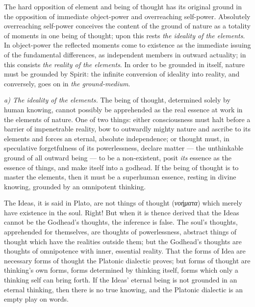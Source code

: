 \documentclass[12pt,a4paper]{book}
\newcommand{\runin}[1]{\emph{#1}\hspace{0.4em}}
\begin{document}
The hard opposition of element and being of thought has its original ground in the opposition of immediate
object-power and overreaching self-power. Absolutely overreaching self-power conceives the content of the ground of
nature as a totality of moments in one being of thought; upon this rests \emph{the ideality of the elements}. In
object-power the reflected moments come to existence as the immediate issuing of the fundamental differences, as
independent members in outward actuality; in this consists \emph{the reality of the elements}. In order to be
grounded in itself, nature must be grounded by Spirit: the infinite conversion of ideality into reality, and
conversely, goes on in \emph{the ground-medium}.

\runin{a) The ideality of the elements.} The being of thought, determined solely by human knowing, cannot possibly
be apprehended as the real essence at work in the elements of nature. One of two things: either consciousness must
halt before a barrier of impenetrable reality, bow to outwardly mighty nature and ascribe to its elements and
forces an eternal, absolute
independence; or thought must, in speculative forgetfulness of its powerlessness, declare matter --- the
unthinkable ground of all outward being --- to be a non-existent, posit \emph{its} essence as the essence of things,
and make itself
into a godhead. If the being of thought is to master the elements, then it must be a superhuman essence, resting in
divine knowing, grounded by an omnipotent thinking.

The Ideas, it is said in Plato, are not things of thought
(\textit{νοήματα}) which merely have existence in the soul. Right! But when it is thence derived that the Ideas
cannot be the Godhead's thoughts, the inference is false. The soul's thoughts, apprehended for themselves, are
thoughts of powerlessness, abstract things of thought which have the realities outside them; but the Godhead's
thoughts are thoughts of omnipotence with inner, essential reality. That the forms of Idea are necessary forms of
thought the Platonic dialectic proves; but forms of thought are thinking's own forms, forms determined by thinking
itself, forms which only a thinking self can bring forth. If the Ideas' eternal being is not grounded in an eternal
thinking, then there is no true knowing, and the Platonic dialectic is an empty play on words.
\end{document}
